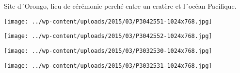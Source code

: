  Site d´Orongo, lieu de cérémonie perché entre un cratère et l´océan Pacifique.

 

\begin{center} \texttt{[image: ../wp-content/uploads/2015/03/P3042551-1024x768.jpg]} \end{center}

 

\begin{center} \texttt{[image: ../wp-content/uploads/2015/03/P3042552-1024x768.jpg]} \end{center}



 

\begin{center} \texttt{[image: ../wp-content/uploads/2015/03/P3032530-1024x768.jpg]} \end{center}

 

\begin{center} \texttt{[image: ../wp-content/uploads/2015/03/P3032531-1024x768.jpg]} \end{center}



 

 

 

 

 

 

 


 
 
